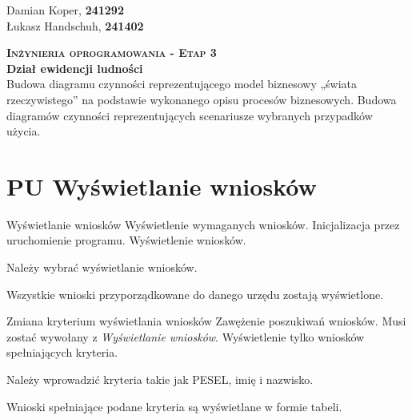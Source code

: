 \documentclass[12pt]{article}
\begin{document}
\begin{flushleft}
        Damian Koper, \textbf{241292} \\
        Łukasz Handschuh, \textbf{241402}
\end{flushleft}
\vspace{1cm}
{
    \centering
    {\Huge\scshape\bfseries Inżynieria oprogramowania - Etap 3 }\\
    \vspace{0.25cm}
    \Large\textbf{Dział ewidencji ludności} \\
    \vspace{0.25cm}
    \large Budowa diagramu czynności reprezentującego model
    biznesowy „świata rzeczywistego” na podstawie
    wykonanego opisu procesów biznesowych. Budowa
    diagramów czynności reprezentujących scenariusze
    wybranych przypadków użycia.\\
}

\section{PU Wyświetlanie wniosków}
\scenario
    {Wyświetlanie wniosków}
    {Wyświetlenie wymaganych wniosków.}
    {Inicjalizacja przez uruchomienie programu.}
    {Wyświetlenie wniosków.}
    {
        \item Należy wybrać wyświetlanie wniosków.
        \item Wszystkie wnioski przyporządkowane do danego urzędu zostają wyświetlone.
    }
\scenario
    {Zmiana kryterium wyświetlania wniosków}
    {Zawężenie poszukiwań wniosków.}
    {Musi zostać wywołany z \textit{Wyświetlanie wniosków}.}
    {Wyświetlenie tylko wniosków spełniających kryteria.}
    {
        \item Należy wprowadzić kryteria takie jak PESEL, imię i nazwisko.
        \item Wnioski spełniające podane kryteria są wyświetlane w formie tabeli.
    }
\end{document}

